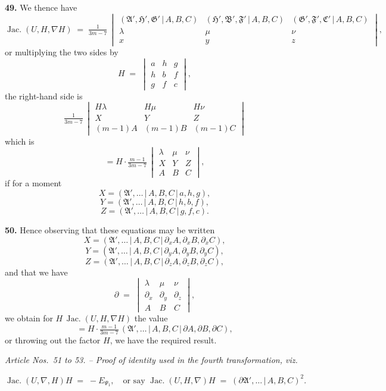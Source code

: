 \documentclass[11pt,a4paper]{article}
\providecommand{\mid}{\,|\,}
\providecommand{\Jac}{\operatorname{Jac.}}
\begin{document}
\textbf{49.} We thence have
\[
\Jac(U,H,\nabla H) \;=\; \tfrac{1}{3m-7}\,\begin{vmatrix} (\mathfrak{A}',\mathfrak{H}',\mathfrak{G}'\mid A,B,C) & (\mathfrak{H}',\mathfrak{B}',\mathfrak{F}'\mid A,B,C) & (\mathfrak{G}',\mathfrak{F}',\mathfrak{C}'\mid A,B,C) \\[2pt] \lambda & \mu & \nu \\[2pt] x & y & z \end{vmatrix},
\]
or multiplying the two sides by
\[
H \;=\; \begin{vmatrix} a & h & g \\ h & b & f \\ g & f & c \end{vmatrix},
\]
the right-hand side is
\[
\tfrac{1}{3m-7}\,\begin{vmatrix} H\lambda & H\mu & H\nu \\ X & Y & Z \\ (m-1)A & (m-1)B & (m-1)C \end{vmatrix}
\]
which is
\[
= H\cdot\tfrac{m-1}{3m-7}\,\begin{vmatrix} \lambda & \mu & \nu \\ X & Y & Z \\ A & B & C \end{vmatrix},
\]
if for a moment
\[
X = (\mathfrak{A}',\ldots\mid A,B,C\mid a,h,g),
\]
\[
Y = (\mathfrak{A}',\ldots\mid A,B,C\mid h,b,f),
\]
\[
Z = (\mathfrak{A}',\ldots\mid A,B,C\mid g,f,c).
\]

\medskip

\textbf{50.} Hence observing that these equations may be written
\[
X = (\mathfrak{A}',\ldots\mid A,B,C\mid \partial_x A,\partial_x B,\partial_x C),
\]
\[
Y = (\mathfrak{A}',\ldots\mid A,B,C\mid \partial_y A,\partial_y B,\partial_y C),
\]
\[
Z = (\mathfrak{A}',\ldots\mid A,B,C\mid \partial_z A,\partial_z B,\partial_z C),
\]
and that we have
\[
\partial \;=\; \begin{vmatrix} \lambda & \mu & \nu \\ \partial_x & \partial_y & \partial_z \\ A & B & C \end{vmatrix},
\]
we obtain for $H\,\Jac(U,H,\nabla H)$ the value
\[
= H\cdot\tfrac{m-1}{3m-7}\,(\mathfrak{A}',\ldots\mid A,B,C\mid \partial A,\partial B,\partial C),
\]
or throwing out the factor $H$, we have the required result.

\bigskip

\begin{center}
\textit{Article Nos.\ 51 to 53. -- Proof of identity used in the fourth transformation, viz.}
\end{center}
\[
\Jac(U,\nabla,H)H \;=\; -E_{\Psi_1},\quad \text{or say } \Jac(U,H,\nabla)H \;=\; (\partial\mathfrak{A}',\ldots\mid A,B,C)^2.
\]
\end{document}
